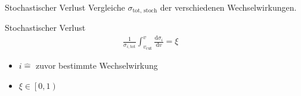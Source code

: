 \documentclass[aspectratio=1610, captions=tableheading, 11pt]{beamer}
\begin{document}
\begin{frame}[fragile]
\begin{columns}
\begin{overprint}
      { 
        \centering
        \begin{block}{Stochastischer Verlust}
          Vergleiche $\sigma_\text{tot, stoch}$ der verschiedenen Wechselwirkungen.\\
        \end{block}
      }

      { 
        \centering
        \begin{block}{Stochastischer Verlust}
          \begin{align*}
              \frac{1}{\sigma_{i, \text{tot}}} \int_{v_\text{cut}}^v \frac{\mathrm{d}\sigma_i}{\mathrm{d}v} = \xi
          \end{align*}
        \end{block}
        \begin{itemize}
            \item $i \hat{=}$ zuvor bestimmte Wechselwirkung \\[0.25cm]
            \item $\xi \in \left[0, 1 \right)$
        \end{itemize}
      }
  \end{overprint}
  \end{columns}
\end{frame}
\end{document}
